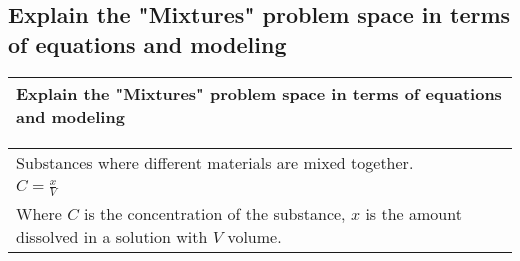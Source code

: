\subsection{
Explain the "Mixtures" problem space in terms of equations and modeling}
\begin{small}
    \begin{tabularx}{1\textwidth}{
            p{}
        }
        \toprule
        Explain the "Mixtures" problem space in terms of equations and modeling
        \\
        \bottomrule
    \end{tabularx}
\end{small}
\begin{small}
    \begin{tabularx}{1\textwidth}{
            p{}
        }
        \toprule
        Substances where different materials are mixed together. \\
        $ C = \frac{x}{V} $\\
        Where $C$ is the concentration of the substance, $x$ is the amount
        dissolved in a solution with $V$ volume.
        \\
        \bottomrule
    \end{tabularx}
\end{small}
